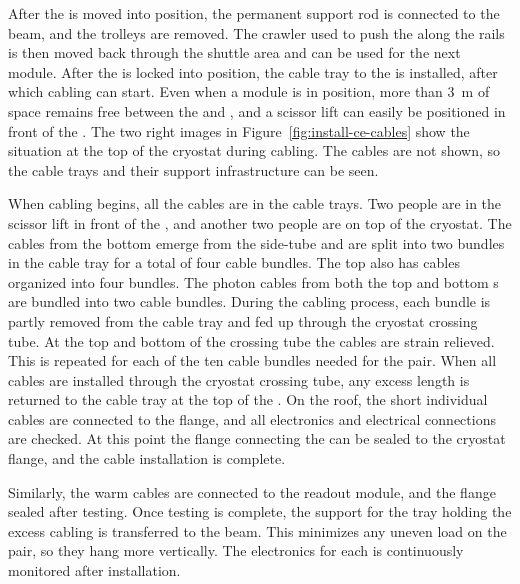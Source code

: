 After the  is moved into position, the permanent support rod is connected to the  beam, and the trolleys are removed. 
The crawler used to push the  along the rails is then moved back through the shuttle area and can be used for the next module. 
After the  is locked into position, the cable tray \fdth to the  is installed, after which  cabling can start. 
Even when a  module is in position, more than \SI{3}{m} of space remains free between the  and , and a scissor lift can easily be positioned in front of the . 
The two right images in Figure~\ref{fig:install-ce-cables} show the situation at the top of the cryostat during cabling. The cables are not shown, so the cable trays and their support infrastructure can be seen. 

When cabling begins, all the cables are in the cable trays. 
Two people are in the scissor lift in front of the , and another two people are on top of the cryostat. 
The  cables from the bottom  emerge from the  side-tube  and are split into two bundles in the cable tray for a total of four cable bundles. 
The top  also has  cables organized into four bundles. 
The photon cables from both the top and bottom s are bundled into two cable bundles.
During the cabling process, each bundle is partly removed from the cable tray and  fed up through the cryostat crossing tube. 
At the top and bottom of the crossing tube  the cables are strain relieved.
This is repeated for each of the ten cable bundles needed for the  pair. 
When all cables are installed through the cryostat crossing tube, any excess length is returned to the cable tray at the top of the . 
On the roof, the short individual cables are connected to the \fdth  flange, and all electronics and electrical connections are checked. 
At this point the flange connecting the  can be sealed to the cryostat \fdth flange, and the cable installation is complete. 

Similarly, the  warm cables are connected to the readout module, and the flange sealed after testing.  
Once testing is complete, the support for the tray holding the excess cabling is transferred to the  beam.  
This minimizes any uneven load on the  pair, so they hang more vertically.   
The electronics for each  is continuously monitored after installation. 


